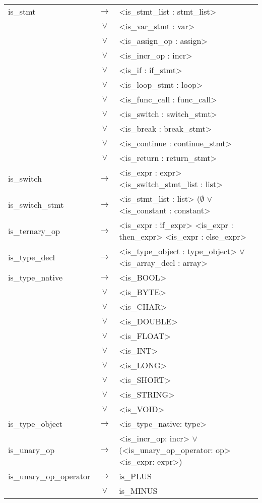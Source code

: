 \documentclass[a4paper]{article}
\begin{document}
\begin{longtable}{lcl}
	is\_stmt					& $\to$ & <is\_stmt\_list : stmt\_list> \\
								& $\vee$ & <is\_var\_stmt : var> \\
								& $\vee$ & <is\_assign\_op : assign> \\
								& $\vee$ & <is\_incr\_op : incr> \\
								& $\vee$ & <is\_if : if\_stmt> \\
								& $\vee$ & <is\_loop\_stmt : loop> \\
								& $\vee$ & <is\_func\_call : func\_call> \\
								& $\vee$ & <is\_switch : switch\_stmt> \\
								& $\vee$ & <is\_break : break\_stmt> \\
								& $\vee$ & <is\_continue : continue\_stmt> \\
								& $\vee$ & <is\_return : return\_stmt> \\
	is\_switch					& $\to$ & <is\_expr : expr> <is\_switch\_stmt\_list : list> \\
	is\_switch\_stmt			& $\to$ & <is\_stmt\_list : list> ($\emptyset$ $\vee$ <is\_constant : constant> \\
	is\_ternary\_op				& $\to$ & <is\_expr : if\_expr> <is\_expr : then\_expr> <is\_expr : else\_expr> \\
	is\_type\_decl				& $\to$ & <is\_type\_object : type\_object> $\vee$ <is\_array\_decl : array> \\
	is\_type\_native			& $\to$ & <is\_BOOL> \\
								& $\vee$ & <is\_BYTE> \\
								& $\vee$ & <is\_CHAR> \\
								& $\vee$ & <is\_DOUBLE> \\
								& $\vee$ & <is\_FLOAT> \\
								& $\vee$ & <is\_INT> \\
								& $\vee$ & <is\_LONG> \\
								& $\vee$ & <is\_SHORT> \\
								& $\vee$ & <is\_STRING> \\
								& $\vee$ & <is\_VOID> \\
	is\_type\_object			& $\to$ & <is\_type\_native: type> \\
	is\_unary\_op				& $\to$ & <is\_incr\_op: incr> $\vee$ (<is\_unary\_op\_operator: op> <is\_expr: expr>) \\
	is\_unary\_op\_operator		& $\to$ & is\_PLUS \\
								& $\vee$ & is\_MINUS \\

\end{longtable}
\end{document}
